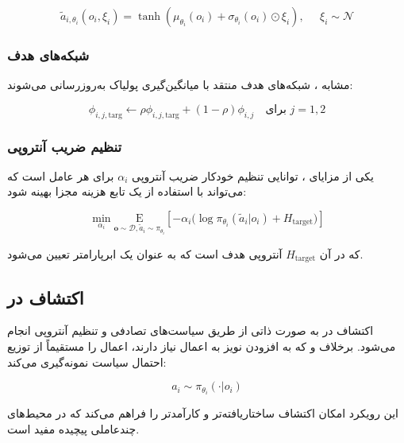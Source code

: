 \begin{equation}
    \tilde{a}_{i,\theta_i}(o_i, \xi_i) = \tanh\left( \mu_{\theta_i}(o_i) + \sigma_{\theta_i}(o_i) \odot \xi_i \right), \;\;\;\;\; \xi_i \sim \mathcal{N}
\end{equation}

\subsubsection{شبکه‌های هدف}

مشابه ، شبکه‌های هدف منتقد با میانگین‌گیری پولیاک به‌روزرسانی می‌شوند:

\begin{equation}
    \phi_{i,j,\text{targ}} \leftarrow \rho \phi_{i,j,\text{targ}} + (1 - \rho) \phi_{i,j} \quad \text{برای } j=1,2
\end{equation}

\subsubsection{تنظیم ضریب آنتروپی}

یکی از مزایای ، توانایی تنظیم خودکار ضریب آنتروپی $\alpha_i$ برای هر عامل است که می‌تواند با استفاده از یک تابع هزینه مجزا بهینه شود:

\begin{equation}
    \min_{\alpha_i} \underset{\boldsymbol{o} \sim \mathcal{D}, \tilde{a}_i \sim \pi_{\theta_i}}{\mathrm{E}}\left[ -\alpha_i \Big(\log \pi_{\theta_i}(\tilde{a}_i|o_i) + H_{\text{target}} \Big) \right]
\end{equation}

که در آن $H_{\text{target}}$ آنتروپی هدف است که به عنوان یک ابرپارامتر تعیین می‌شود.

\subsection{اکتشاف در }

اکتشاف در  به صورت ذاتی از طریق سیاست‌های تصادفی و تنظیم آنتروپی انجام می‌شود. برخلاف  و  که به افزودن نویز به اعمال نیاز دارند،  اعمال را مستقیماً از توزیع احتمال سیاست نمونه‌گیری می‌کند:

\begin{equation}
    a_i \sim \pi_{\theta_i}(\cdot|o_i)
\end{equation}

این رویکرد امکان اکتشاف ساختاریافته‌تر و کارآمدتر را فراهم می‌کند که در محیط‌های چند­عاملی پیچیده مفید است.

